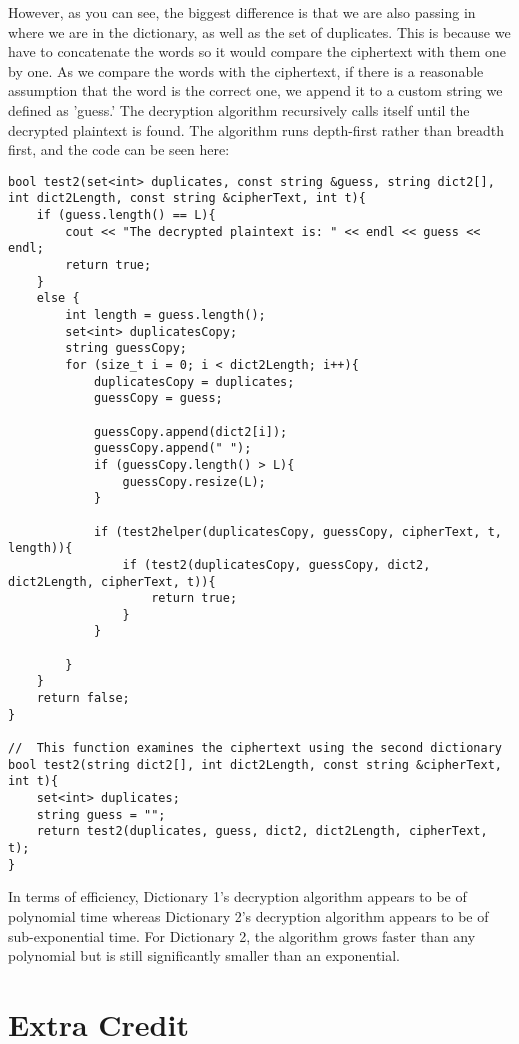 \documentclass[a4paper,twoside,10pt]{report}
\begin{document}
However, as you can see, the biggest difference is that we are also passing in where we are in the dictionary, as well as the set of duplicates. This is because we have to concatenate the words so it would compare the ciphertext with them one by one. As we compare the words with the ciphertext, if there is a reasonable assumption that the word is the correct one, we append it to a custom string we defined as 'guess.' The decryption algorithm recursively calls itself until the decrypted plaintext is found. The algorithm runs depth-first rather than breadth first, and the code can be seen here:

\begin{lstlisting}
bool test2(set<int> duplicates, const string &guess, string dict2[], int dict2Length, const string &cipherText, int t){
	if (guess.length() == L){
		cout << "The decrypted plaintext is: " << endl << guess << endl;
		return true;
	}
	else {
		int length = guess.length();
		set<int> duplicatesCopy;
		string guessCopy;
		for (size_t i = 0; i < dict2Length; i++){
			duplicatesCopy = duplicates;
			guessCopy = guess;

			guessCopy.append(dict2[i]);
			guessCopy.append(" ");
			if (guessCopy.length() > L){
				guessCopy.resize(L);
			}

			if (test2helper(duplicatesCopy, guessCopy, cipherText, t, length)){
				if (test2(duplicatesCopy, guessCopy, dict2, dict2Length, cipherText, t)){
					return true;
				}
			}

		}
	}
	return false;
}

//	This function examines the ciphertext using the second dictionary
bool test2(string dict2[], int dict2Length, const string &cipherText, int t){
	set<int> duplicates;
	string guess = "";
	return test2(duplicates, guess, dict2, dict2Length, cipherText, t);
}
\end{lstlisting}

\vspace{4mm}
In terms of efficiency, Dictionary 1's decryption algorithm appears to be of polynomial time whereas Dictionary 2's decryption algorithm appears to be of sub-exponential time. For Dictionary 2, the algorithm grows faster than any polynomial but is still significantly smaller than an exponential. 

\vspace{4mm}

\chapter{Extra Credit}\label{extra}
\end{document}
